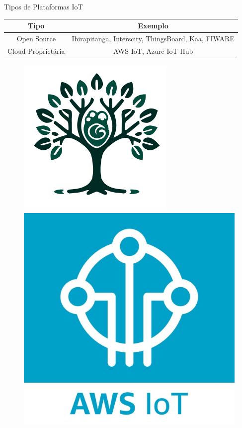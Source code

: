 \documentclass[aspectratio=169,xcolor=dvipsnames]{beamer}
\begin{document}
\begin{frame}{Tipos de Plataformas IoT}

\begin{table}[]
    \centering
    \begin{tabular}{|c|c|}
    \hline
       Tipo  & Exemplo  \\
       \hline
       Open Source	  & Ibirapitanga, Interscity, ThingsBoard, Kaa, FIWARE\\
       \hline
       Cloud Proprietária	& AWS IoT, Azure IoT Hub\\
       \hline
    \end{tabular}
\end{table}
\begin{figure}
    \centering
    \includegraphics[width=0.3\linewidth]{Figuras/logo-ibira.png}
    \includegraphics[width=0.3\linewidth]{Figuras/aws-iot.jpg}
\end{figure}
\end{frame}
\end{document}
